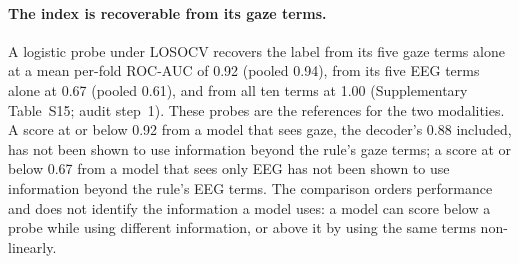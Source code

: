 \paragraph{The index is recoverable from its gaze terms.} A logistic probe under LOSOCV recovers the label from its five gaze terms alone at a mean per-fold ROC-AUC of 0.92 (pooled 0.94), from its five EEG terms alone at 0.67 (pooled 0.61), and from all ten terms at 1.00 (Supplementary Table~S15; audit step~1). These probes are the references for the two modalities. A score at or below 0.92 from a model that sees gaze, the decoder's 0.88 included, has not been shown to use information beyond the rule's gaze terms; a score at or below 0.67 from a model that sees only EEG has not been shown to use information beyond the rule's EEG terms. The comparison orders performance and does not identify the information a model uses: a model can score below a probe while using different information, or above it by using the same terms non-linearly.


